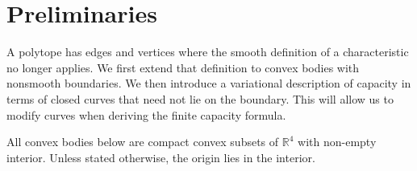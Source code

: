 \section{Preliminaries}\label{sec:preliminaries}

A polytope has edges and vertices where the smooth definition of a
characteristic no longer applies. We first extend that definition to convex
bodies with nonsmooth boundaries. We then introduce a variational description
of capacity in terms of closed curves that need not lie on the boundary.
This will allow us to modify curves when deriving the finite capacity formula.

All convex bodies below are compact convex subsets of \(\mathbb{R}^4\) with
non-empty interior. Unless stated otherwise, the origin lies in the interior.







